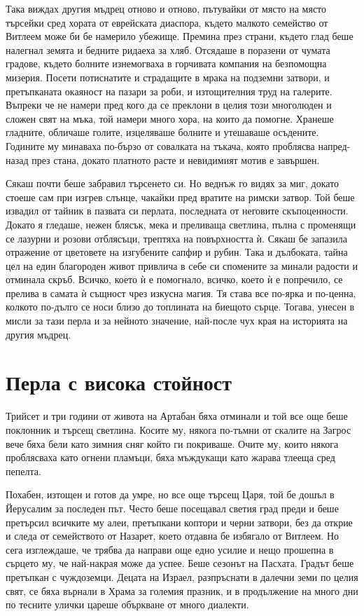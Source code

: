 Така виждах другия мъдрец отново и отново, пътувайки от място на място търсейки
сред хората от еврейската диаспора, където малкото семейство от Витлеем може би
бе намерило убежище. Премина през страни, където глад беше налегнал земята и
бедните ридаеха за хляб. Отсядаше в поразени от чумата градове, където болните
изнемогваха в горчивата компания на безпомощна мизерия. Посети потиснатите и
страдащите в мрака на подземни затвори, и претъпканата окаяност на пазари за
роби, и изтощителния труд на галерите. Въпреки че не намери пред кого да се
преклони в целия този многолюден и сложен свят на мъка, той намери много хора,
на които да помогне. Хранеше гладните, обличаше голите, изцеляваше болните и
утешаваше осъдените. Годините му минаваха по-бързо от совалката на тъкача, която
проблясва напред-назад през стана, докато платното расте и невидимият мотив е
завършен.

Сякаш почти беше забравил търсенето си. Но веднъж го видях за миг, докато стоеше
сам при изгрев слънце, чакайки пред вратите на римски затвор. Той беше извадил
от тайник в пазвата си перлата, последната от неговите скъпоценности. Докато я
гледаше, нежен блясък, мека и преливаща светлина, пълна с променящи се лазурни и
розови отблясъци, трептяха на повърхността ѝ. Сякаш бе запазила отражение от
цветовете на изгубените сапфир и рубин. Така и дълбоката, тайна цел на един
благороден живот привлича в себе си спомените за минали радости и отминала
скръб. Всичко, което ѝ е помогнало, всичко, което ѝ е попречило, се прелива в
самата ѝ същност чрез изкусна магия. Тя става все по-ярка и по-ценна, колкото
по-дълго се носи близо до топлината на биещото сърце. Тогава, унесен в мисли за
тази перла и за нейното значение, най-после чух края на историята на другия
мъдрец.

\part{Перла с висока стойност}

Трийсет и три години от живота на Артабан бяха отминали и той все още беше
поклонник и търсещ светлина. Косите му, някога по-тъмни от скалите на Загрос
вече бяха бели като зимния сняг който ги покриваше. Очите му, които някога
проблясваха като огнени пламъци, бяха мъждукащи като жарава тлееща сред пепелта.

Похабен, изтощен и готов да умре, но все още търсещ Царя, той бе дошъл в
Йерусалим за последен път. Често беше посещавал светия град преди и беше
претърсил всичките му алеи, претъпкани коптори и черни затвори, без да открие и
следа от семейството от Назарет, което отдавна бе избягало от Витлеем. Но сега
изглеждаше, че трябва да направи още едно усилие и нещо прошепна в сърцето му,
че най-накрая може да успее. Беше сезонът на Пасхата. Градът беше претъпкан с
чуждоземци. Децата на Израел, разпръснати в далечни земи по целия свят, се бяха
върнали в Храма за големия празник, и в продължение на много дни по тесните
улички цареше объркване от много диалекти.

